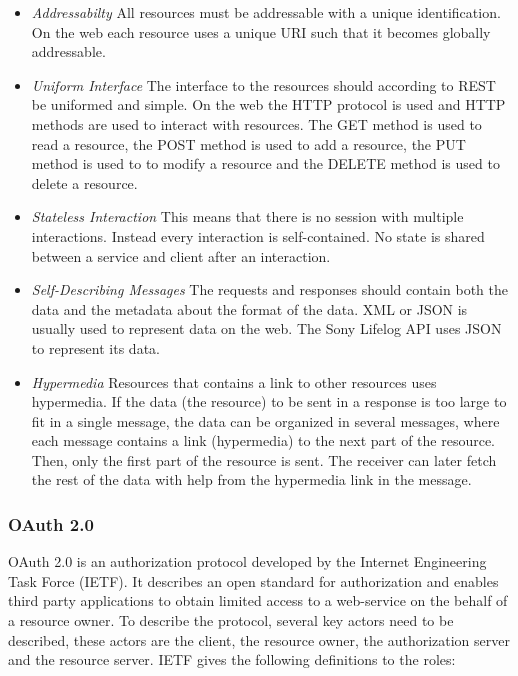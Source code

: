 \documentclass{cslthse-msc}
\begin{document}
\begin{itemize}
    \item \emph{Addressabilty} All resources must be addressable with a unique identification. On the web each resource uses a unique URI such that it becomes globally addressable.
    \item \emph{Uniform Interface} The interface to the resources should according to REST be uniformed and simple. On the web the HTTP protocol is used and HTTP methods are used to interact with resources. The GET method is used to read a resource, the POST method is used to add a resource, the PUT method is used to to modify a resource and the DELETE method is used to delete a resource.
    \item \emph{Stateless Interaction} This means that there is no session with multiple interactions. Instead every interaction is self-contained. No state is shared between a service and client after an interaction.
    \item \emph{Self-Describing Messages} The requests and responses should contain both the data and the metadata about the format of the data. XML or JSON is usually used to represent data on the web. The Sony Lifelog API uses JSON to represent its data.
\item \emph{Hypermedia} Resources that contains a link to other resources uses hypermedia. If the data (the resource) to be sent in a response is too large to fit in a single message, the data can be organized in several messages, where each message contains a link (hypermedia) to the next part of the resource. Then, only the first part of the resource is sent. The receiver can later fetch the rest of the data with help from the hypermedia link in the message.

\end{itemize}

\subsubsection{OAuth 2.0}

OAuth 2.0 is an authorization protocol developed by the Internet Engineering Task Force (IETF). It describes an open standard for authorization and enables third party applications to obtain limited access to a web-service on the behalf of a resource owner\cite{oauth2spec}. To describe the protocol, several key actors need to be described, these actors are the client, the resource owner, the authorization server and the resource server. IETF gives the following definitions to the roles:
\end{document}
